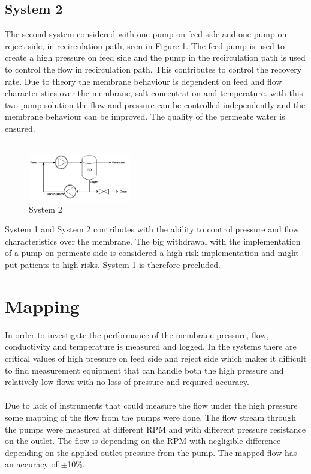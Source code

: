 \subsection{System 2}
The second system considered with one pump on feed side and one pump on reject side, in recirculation path, seen in Figure \ref{fig:Sys2}. The feed pump is used to create a high pressure on feed side and the pump in the recirculation path is used to control the flow in recirculation path. This contributes to control the recovery rate. Due to theory the membrane behaviour is dependent on feed and flow characteristics over the membrane, salt concentration and temperature. with this two pump solution the flow and pressure can be controlled independently and the membrane behaviour can be improved. The quality of the permeate water is ensured. \\
\\
\begin{figure}[h]
    \centering
    \includegraphics[width=0.4\textwidth]{Sys2}
    \caption{System 2}
    \label{fig:Sys2}
\end{figure}
\newpage

System 1 and System 2 contributes with the ability to control pressure and flow characteristics over the membrane. The big withdrawal with the implementation of a pump on permeate side is considered a high risk implementation and might put patients to high risks. System 1 is therefore precluded.

\section{Mapping}
In order to investigate the performance of the membrane pressure, flow, conductivity and temperature is  measured and logged. In the systems there are critical values of high pressure on feed side and reject side which makes it difficult to find measurement equipment that can handle both the high pressure and relatively low flows with no loss of pressure and required accuracy. \\
\\
Due to lack of instruments that could measure the flow under the high pressure some mapping of the flow from the pumps were done. The flow stream through the pumps were measured at different RPM and with different pressure resistance on the outlet. The flow is depending on the RPM with negligible difference depending on the applied outlet pressure from the pump. The mapped flow has an accuracy of $\pm$10\%.

